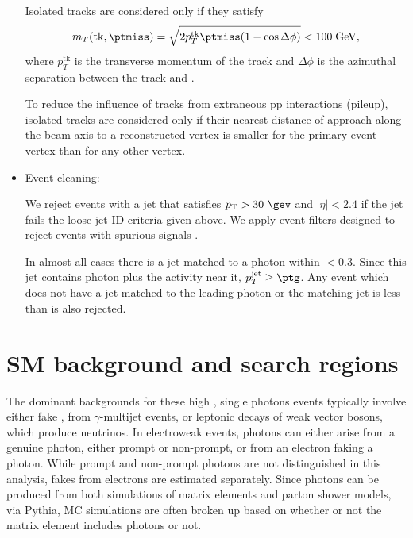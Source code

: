 \begin{itemize}
  Isolated tracks are considered only if they satisfy
  \begin{equation}\label{eq:mt_isotk}
    m_{T}(\mathrm{tk},\ptmiss) = \sqrt{2p_{T}^{\mathrm{tk}}\ptmiss(1-\cos\Delta\phi)}<100\;\mathrm{GeV},
  \end{equation}
  where $p_{T}^{\mathrm{tk}}$ is the transverse momentum of the track and
  $\Delta\phi$ is the azimuthal separation between the track and \ptvecmiss.

  To reduce the influence of tracks from extraneous pp interactions (pileup),
  isolated tracks are considered only if their nearest distance of approach
  along the beam axis to a reconstructed vertex
  is smaller for the primary event vertex than for any other vertex.

\item Event cleaning:

  We reject events with a jet that satisfies $\pt>30\ \gev$ and
  $|\eta|<2.4$ if the jet fails the loose jet ID criteria given above.
  We apply event filters designed to reject events with
  spurious \ptmiss signals \cite{CMS-PAS-JME-16-004}. 
  
  In almost all cases
  there is a jet matched to a photon within \dR $<0.3$.
  Since this jet contains photon plus the activity near it, $p_{T}^{\mathrm{jet}} \geq \ptg $.
  Any event which does not have a jet matched to the leading photon or the matching jet \pt
  is less than \ptg is also rejected.
\end{itemize}

\section{SM background and search regions}
The dominant backgrounds for these high \ptmiss, single photons events typically involve either fake \ptmiss, from $\gamma$-multijet events, or leptonic 
decays of weak vector bosons, which produce neutrinos.  In electroweak events, photons can either arise from a genuine photon,
either prompt or non-prompt, or from an electron faking a photon.  While prompt and non-prompt photons are not distinguished
in this analysis, fakes from electrons are estimated separately.  Since photons can be produced from both simulations of
matrix elements and parton shower models, via Pythia, MC simulations are often broken up based on whether or not the matrix 
element includes photons or not. 

